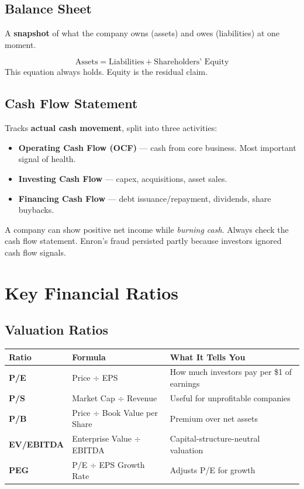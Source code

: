 \subsection{Balance Sheet}
A \textbf{snapshot} of what the company owns (assets) and owes (liabilities) at one moment.

\begin{formulabox}
\[
  \text{Assets} = \text{Liabilities} + \text{Shareholders' Equity}
\]
This equation always holds. Equity is the residual claim.
\end{formulabox}

\subsection{Cash Flow Statement}
Tracks \textbf{actual cash movement}, split into three activities:
\begin{itemize}
  \item \textbf{Operating Cash Flow (OCF)} — cash from core business. Most important signal of health.
  \item \textbf{Investing Cash Flow} — capex, acquisitions, asset sales.
  \item \textbf{Financing Cash Flow} — debt issuance/repayment, dividends, share buybacks.
\end{itemize}

\begin{warningbox}
A company can show positive net income while \emph{burning cash}. Always check the
cash flow statement. Enron's fraud persisted partly because investors ignored cash flow signals.
\end{warningbox}

\section{Key Financial Ratios}

\subsection{Valuation Ratios}

\begin{center}
\begin{tabular}{>{\bfseries}p{3cm} p{5cm} p{5cm}}
\toprule
Ratio & Formula & What It Tells You \\
\midrule
P/E & Price $\div$ EPS & How much investors pay per \$1 of earnings \\
P/S & Market Cap $\div$ Revenue & Useful for unprofitable companies \\
P/B & Price $\div$ Book Value per Share & Premium over net assets \\
EV/EBITDA & Enterprise Value $\div$ EBITDA & Capital-structure-neutral valuation \\
PEG & P/E $\div$ EPS Growth Rate & Adjusts P/E for growth \\
\bottomrule
\end{tabular}
\end{center}

